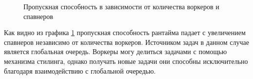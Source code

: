 \begin{figure}[H]
    \begin{center}
    \end{center}

    \caption{Пропускная способность в зависимости от количества воркеров и спавнеров}
    \label{fig:tatlin:line:nspawn:5000}
\end{figure}

Как видно из графика \ref{fig:tatlin:line:nspawn:5000} пропускная способность рантайма падает с увеличением спавнеров независимо от количества воркеров. Источником задач в данном случае является глобальная очередь. Воркеры могу делиться задачами с помощью механизма стилинга, однако получать новые задачи они способны исключительно благодаря взаимодействию с глобальной очередью.


